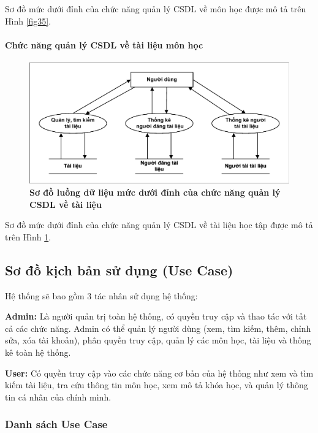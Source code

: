 \documentclass{article}
\begin{document}
	Sơ đồ mức dưới đỉnh của chức năng quản lý CSDL về môn học được mô tả trên Hình \ref{fig35}.
	
	\paragraph{Chức năng quản lý CSDL về tài liệu môn học} \mbox{}
	
	\begin{figure}[!ht]
		\centering
		\includegraphics[trim= 10pt 10pt 10pt 10pt, clip, width=16.25cm]{mucduoidinh_fig36.pdf}
		\caption [Sơ đồ luồng dữ liệu mức dưới đỉnh của chức năng quản lý CSDL về tài liệu]{\bfseries \fontsize{12pt}{0pt}\selectfont Sơ đồ luồng dữ liệu mức dưới đỉnh của chức năng quản lý CSDL về tài liệu}
		\label{fig36}
	\end{figure}
	
	Sơ đồ mức dưới đỉnh của chức năng quản lý CSDL về tài liệu học tập được mô tả trên Hình \ref{fig36}.
	
	\subsection{Sơ đồ kịch bản sử dụng (Use Case)}
	
	Hệ thống sẽ bao gồm 3 tác nhân sử dụng hệ thống:
	
	\textbf{Admin:} Là người quản trị toàn hệ thống, có quyền truy cập và thao tác với tất cả các chức năng. Admin có thể quản lý người dùng (xem, tìm kiếm, thêm, chỉnh sửa, xóa tài khoản), phân quyền truy cập, quản lý các môn học, tài liệu và thống kê toàn hệ thống.
	
	\textbf{User:} Có quyền truy cập vào các chức năng cơ bản của hệ thống như xem và tìm kiếm tài liệu, tra cứu thông tin môn học, xem mô tả khóa học, và quản lý thông tin cá nhân của chính mình.
	
	\subsubsection{Danh sách Use Case}
	
\end{document}
